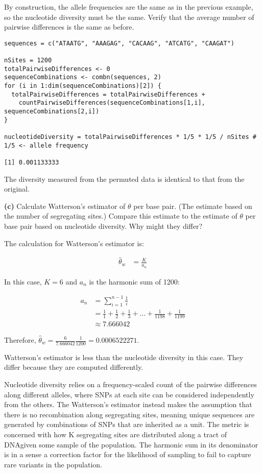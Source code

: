 \documentclass{essay}
\begin{document}
\begin{essaystyle}
By construction, the allele frequencies are the same as in the previous
example, so the nucleotide diversity must be the same. Verify that the average
number of pairwise differences is the same as before. 

\begin{verbatim}
sequences = c("ATAATG", "AAAGAG", "CACAAG", "ATCATG", "CAAGAT")

nSites = 1200
totalPairwiseDifferences <- 0
sequenceCombinations <- combn(sequences, 2)
for (i in 1:dim(sequenceCombinations)[2]) { 
  totalPairwiseDifferences = totalPairwiseDifferences + 
    countPairwiseDifferences(sequenceCombinations[1,i], sequenceCombinations[2,i])
}

nucleotideDiversity = totalPairwiseDifferences * 1/5 * 1/5 / nSites # 1/5 <- allele frequency

[1] 0.001133333
\end{verbatim}

The diversity measured from the permuted data is identical to that from the original.

\textbf{(c)} Calculate Watterson’s estimator of $\theta$ per base pair. (The estimate
based on the number of segregating sites.) Compare this estimate to the
estimate of $\theta$ per base pair based on nucleotide diversity. Why might
they differ?

The calculation for Watterson's estimator is:

\begin{align}
  \hat\theta_w &= \frac{K}{a_n}
\end{align}

In this case, $K = 6$ and $a_n$ is the harmonic sum of 1200:

\begin{align}
  a_n &= \sum^{n-1}_{i=1}\frac{1}{i} \\
  &= \frac{1}{1} + \frac{1}{2} + \frac{1}{3} + \ldots + \frac{1}{1198} + \frac{1}{1199} \\
  &\approx 7.666042
\end{align}

Therefore, $\hat\theta_w = \frac{6}{7.666042} \frac{1}{1200} = 0.0006522271$.

Watterson's estimator is less than the nucleotide diversity in this case. They
differ because they are computed differently.

Nucleotide diversity relies on a frequency-scaled count of the pairwise
differences along different alleles, where SNPs at each site can be considered
independently from the others. The Watterson's estimator instead makes the
assumption that there is no recombination along segregating sites, meaning
unique sequences are generated by combinations of SNPs that are inherited as a
unit. The metric is concerned with how K segregating sites are distributed
along a tract of DNA\@ given some sample of the population. The harmonic sum in
its denominator is in a sense a correction factor for the likelihood of
sampling to fail to capture rare variants in the population.


\end{essaystyle}
\end{document}
